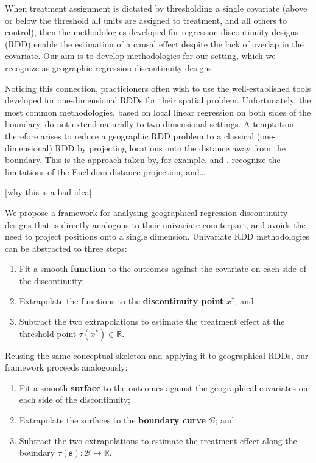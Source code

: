 \documentclass[letter]{article}
\providecommand{\tightlist}{%
      \setlength{\itemsep}{0pt}\setlength{\parskip}{0pt}}
\newcommand{\svec}{\mathbold{s}}
\newcommand{\boundary}{\mathcal{B}}
\providecommand{\tightlist}{%
  	  \setlength{\itemsep}{0pt}\setlength{\parskip}{0pt}}
\renewcommand{\cite}[1]{\citep{#1}}
\begin{document}
When treatment assignment is dictated by thresholding a single covariate (above or below the threshold all units are assigned to treatment, and all others to control), then the methodologies developed for regression discontinuity designs (RDD) enable the estimation of a causal effect despite the lack of overlap in the covariate. Our aim is to develop methodologies for our setting, which we recognize as geographic regression discontinuity designs \cite{keele_titiunik_2015}.

Noticing this connection, practicioners often wish to use the well-established tools developed for one-dimensional RDDs for their spatial problem.
Unfortunately, the most common methodologies, based on local linear regression on both sides of the boundary, do not extend naturally to two-dimensional settings.
A temptation therefore arises to reduce a geographic RDD problem to a classical (one-dimensional) RDD by projecting locations onto the distance away from the boundary.
This is the approach taken by, for example, \cite{macdonald2015effect} and \cite{chen2013evidence}. \cite{keele_titiunik_2015} recognize the limitations of the Euclidian distance projection, and\ldots{}

{[}why this is a bad idea{]}
    


    	We propose a framework for analysing geographical regression discontinuity designs that is directly analogous to their univariate counterpart, and avoids the need to project positions onto a single dimension.
Univariate RDD methodologies can be abstracted to three steps:

\begin{enumerate}
\def\labelenumi{\arabic{enumi}.}
\tightlist
\item
  Fit a smooth \textbf{function} to the outcomes against the covariate on each side of the discontinuity;
\item
  Extrapolate the functions to the \textbf{discontinuity point} \(x^*\); and
\item
  Subtract the two extrapolations to estimate the treatment effect at the threshold point \(\tau(x^*) \in \mathbb{R}\).
\end{enumerate}

Reusing the same conceptual skeleton and applying it to geographical RDDs, our framework proceeds analogously:

\begin{enumerate}
\def\labelenumi{\arabic{enumi}.}
\tightlist
\item
  Fit a smooth \textbf{surface} to the outcomes against the geographical covariates on each side of the discontinuity;
\item
  Extrapolate the surfaces to the \textbf{boundary curve} \(\boundary\); and
\item
  Subtract the two extrapolations to estimate the treatment effect along the boundary \(\tau(\svec): \boundary \rightarrow \mathbb{R}\).
\end{enumerate}
    
\end{document}
